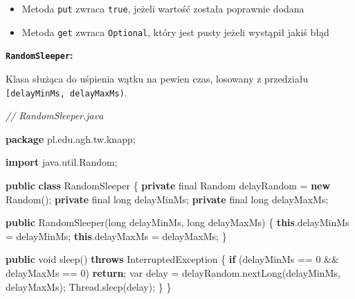 \documentclass[11pt]{article}
\providecommand{\tightlist}{%
      \setlength{\itemsep}{0pt}\setlength{\parskip}{0pt}}
\newenvironment{Shaded}{}{}
\newcommand{\KeywordTok}[1]{\textcolor[rgb]{0.00,0.44,0.13}{\textbf{{#1}}}}
\newcommand{\DataTypeTok}[1]{\textcolor[rgb]{0.56,0.13,0.00}{{#1}}}
\newcommand{\DecValTok}[1]{\textcolor[rgb]{0.25,0.63,0.44}{{#1}}}
\newcommand{\CommentTok}[1]{\textcolor[rgb]{0.38,0.63,0.69}{\textit{{#1}}}}
\newcommand{\FunctionTok}[1]{\textcolor[rgb]{0.02,0.16,0.49}{{#1}}}
\newcommand{\NormalTok}[1]{{#1}}
\newcommand{\ImportTok}[1]{{#1}}
\newcommand{\ControlFlowTok}[1]{\textcolor[rgb]{0.00,0.44,0.13}{\textbf{{#1}}}}
\newcommand{\OperatorTok}[1]{\textcolor[rgb]{0.40,0.40,0.40}{{#1}}}
\newcommand{\BuiltInTok}[1]{{#1}}
\begin{document}
\begin{itemize}
\tightlist
\item
  Metoda \texttt{put} zwraca \texttt{true}, jeżeli wartość została
  poprawnie dodana
\item
  Metoda \texttt{get} zwraca \texttt{Optional}, który jest pusty jeżeli
  wystąpił jakiś błąd
\end{itemize}

\textbf{\texttt{RandomSleeper}:}

Klasa służąca do uśpienia wątku na pewien czas, losowany z przedziału
\texttt{{[}delayMinMs,\ delayMaxMs)}.

\begin{Shaded}
\begin{Highlighting}[]
\CommentTok{// RandomSleeper.java}

\KeywordTok{package}\ImportTok{ pl}\OperatorTok{.}\ImportTok{edu}\OperatorTok{.}\ImportTok{agh}\OperatorTok{.}\ImportTok{tw}\OperatorTok{.}\ImportTok{knapp}\OperatorTok{;}

\KeywordTok{import} \ImportTok{java}\OperatorTok{.}\ImportTok{util}\OperatorTok{.}\ImportTok{Random}\OperatorTok{;}

\KeywordTok{public} \KeywordTok{class}\NormalTok{ RandomSleeper }\OperatorTok{\{}
    \KeywordTok{private} \DataTypeTok{final} \BuiltInTok{Random}\NormalTok{ delayRandom }\OperatorTok{=} \KeywordTok{new} \BuiltInTok{Random}\OperatorTok{();}
    \KeywordTok{private} \DataTypeTok{final} \DataTypeTok{long}\NormalTok{ delayMinMs}\OperatorTok{;}
    \KeywordTok{private} \DataTypeTok{final} \DataTypeTok{long}\NormalTok{ delayMaxMs}\OperatorTok{;}

    \KeywordTok{public} \FunctionTok{RandomSleeper}\OperatorTok{(}\DataTypeTok{long}\NormalTok{ delayMinMs}\OperatorTok{,} \DataTypeTok{long}\NormalTok{ delayMaxMs}\OperatorTok{)} \OperatorTok{\{}
        \KeywordTok{this}\OperatorTok{.}\FunctionTok{delayMinMs} \OperatorTok{=}\NormalTok{ delayMinMs}\OperatorTok{;}
        \KeywordTok{this}\OperatorTok{.}\FunctionTok{delayMaxMs} \OperatorTok{=}\NormalTok{ delayMaxMs}\OperatorTok{;}
    \OperatorTok{\}}

    \KeywordTok{public} \DataTypeTok{void} \FunctionTok{sleep}\OperatorTok{()} \KeywordTok{throws} \BuiltInTok{InterruptedException} \OperatorTok{\{}
        \ControlFlowTok{if} \OperatorTok{(}\NormalTok{delayMinMs }\OperatorTok{==} \DecValTok{0} \OperatorTok{\&\&}\NormalTok{ delayMaxMs }\OperatorTok{==} \DecValTok{0}\OperatorTok{)}
            \ControlFlowTok{return}\OperatorTok{;}
        \DataTypeTok{var}\NormalTok{ delay }\OperatorTok{=}\NormalTok{ delayRandom}\OperatorTok{.}\FunctionTok{nextLong}\OperatorTok{(}\NormalTok{delayMinMs}\OperatorTok{,}\NormalTok{ delayMaxMs}\OperatorTok{);}
        \BuiltInTok{Thread}\OperatorTok{.}\FunctionTok{sleep}\OperatorTok{(}\NormalTok{delay}\OperatorTok{);}
    \OperatorTok{\}}
\OperatorTok{\}}
\end{Highlighting}
\end{Shaded}
\end{document}

